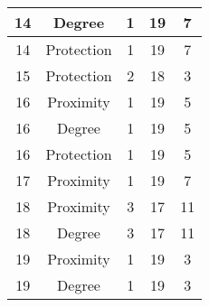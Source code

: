 \documentclass[results.tex]{subfiles}
\begin{document}
\begin{center}
\begin{tabular}{| c || c | c | c | c |}
    \hline
    14 & Degree & 1 & 19 & 7 \\
    \hline
    14 & Protection & 1 & 19 & 7 \\
    \hline
    15 & Protection & 2 & 18 & 3 \\
    \hline
    16 & Proximity & 1 & 19 & 5 \\
    \hline
    16 & Degree & 1 & 19 & 5 \\
    \hline
    16 & Protection & 1 & 19 & 5 \\
    \hline
    17 & Proximity & 1 & 19 & 7 \\
    \hline
    18 & Proximity & 3 & 17 & 11 \\
    \hline
    18 & Degree & 3 & 17 & 11 \\
    \hline
    19 & Proximity & 1 & 19 & 3 \\
    \hline
    19 & Degree & 1 & 19 & 3 \\
    \hline
  \end{tabular}
\end{center}
\end{document}

